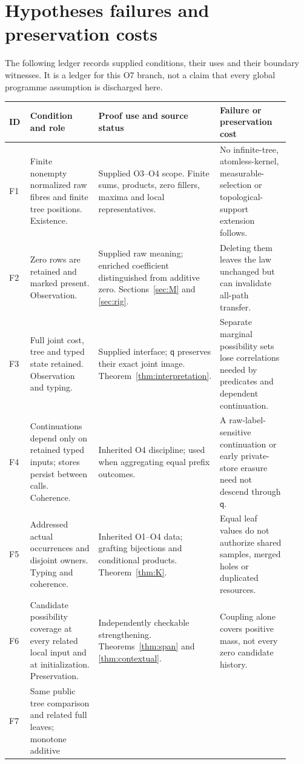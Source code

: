 \documentclass[11pt,a4paper]{article}
\theoremstyle{definition}
\newcommand{\qobs}{\mathsf{q}}
\begin{document}
\section{Hypotheses failures and preservation costs}\label{sec:ledger}
The following ledger records supplied conditions, their uses and their
boundary witnesses. It is a ledger for this O7 branch, not a claim that
every global programme assumption is discharged here.
\small
\begin{longtable}{@{}p{0.08\linewidth}p{0.27\linewidth}p{0.29\linewidth}p{0.28\linewidth}@{}}
\toprule
ID & Condition and role & Proof use and source status & Failure or preservation cost\\
\midrule
\endhead
F1 & Finite nonempty normalized raw fibres and finite tree positions.
Existence. & Supplied O3--O4 scope. Finite sums, products, zero fillers,
maxima and local representatives. & No infinite-tree, atomless-kernel,
measurable-selection or topological-support extension follows.\\
F2 & Zero rows are retained and marked present. Observation. & Supplied
raw meaning; enriched coefficient distinguished from additive zero.
Sections~\ref{sec:M} and \ref{sec:rig}. & Deleting them leaves the law
unchanged but can invalidate all-path transfer.\\
F3 & Full joint cost, tree and typed state retained. Observation and typing.
& Supplied interface; $\qobs$ preserves their exact joint image.
Theorem~\ref{thm:interpretation}. & Separate marginal possibility sets
lose correlations needed by predicates and dependent continuation.\\
F4 & Continuations depend only on retained typed inputs; stores persist
between calls. Coherence. & Inherited O4 discipline; used when aggregating
equal prefix outcomes. & A raw-label-sensitive continuation or early
private-store erasure need not descend through $\qobs$.\\
F5 & Addressed actual occurrences and disjoint owners. Typing and coherence.
& Inherited O1--O4 data; grafting bijections and conditional products.
Theorem~\ref{thm:K}. & Equal leaf values do not authorize shared samples,
merged holes or duplicated resources.\\
F6 & Candidate possibility coverage at every related local input and at
initialization. Preservation. & Independently checkable strengthening.
Theorems~\ref{thm:span} and \ref{thm:contextual}. & Coupling alone covers
positive mass, not every zero candidate history.\\
F7 & Same public tree comparison and related full leaves; monotone additive

\end{longtable}
\end{document}
